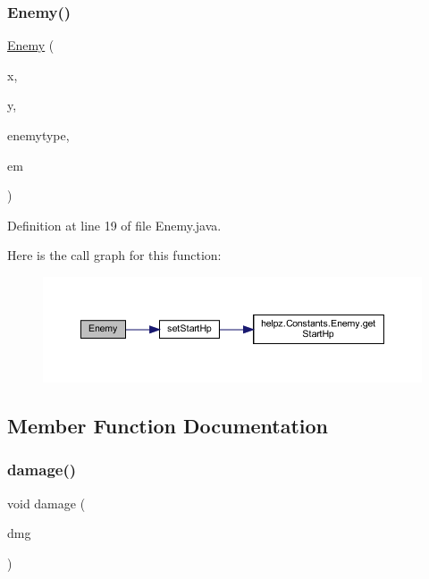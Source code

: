 \subsubsection{\texorpdfstring{Enemy()}{Enemy()}}
{\footnotesize\ttfamily \hyperlink{classenemies_1_1_enemy}{Enemy} (\begin{DoxyParamCaption}\item[{float}]{x,  }\item[{float}]{y,  }\item[{int}]{enemytype,  }\item[{\hyperlink{classmanagers_1_1_enemy_manager}{Enemy\+Manager}}]{em }\end{DoxyParamCaption})}



Definition at line 19 of file Enemy.\+java.

Here is the call graph for this function\+:\nopagebreak
\begin{figure}[H]
\begin{center}
\leavevmode
\includegraphics[width=350pt]{classenemies_1_1_enemy_afa298133293bebcdafef5956df1d1911_cgraph}
\end{center}
\end{figure}


\subsection{Member Function Documentation}
\mbox{\label{classenemies_1_1_enemy_ab316db3306dfd12457e3df71e933ca2d}} 
\subsubsection{\texorpdfstring{damage()}{damage()}}
{\footnotesize\ttfamily void damage (\begin{DoxyParamCaption}\item[{int}]{dmg }\end{DoxyParamCaption})}



